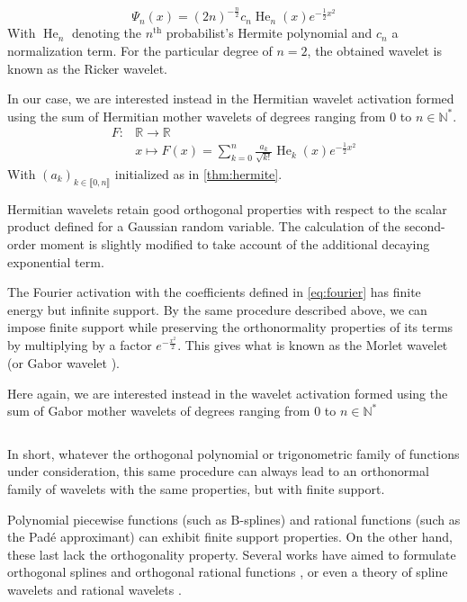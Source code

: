 \documentclass{article} %
\theoremstyle{plain}
\theoremstyle{definition}
\theoremstyle{remark}
\begin{document}
\begin{equation}
{\displaystyle \Psi _{n}(x)=(2n)^{-{\frac {n}{2}}}c_{n}\operatorname {He} _{n}\left(x\right)e^{-{\frac {1}{2}}x^{2}}}
\end{equation}
With $\operatorname {He} _{n}$ denoting the ${\displaystyle n^{\textrm {th}}}$ probabilist's Hermite polynomial and $c_n$ a normalization term. For the particular degree of $n = 2$, the obtained wavelet is known as the Ricker wavelet.

In our case, we are interested instead in the Hermitian wavelet activation formed using the sum of Hermitian mother wavelets of degrees ranging from $0$ to $n \in \mathbb{N}^*$.
\begin{align}
    F \colon & \mathbb{R} \to \mathbb{R}  \nonumber \\
     & x \mapsto F(x)= \sum^{n}_{k=0} \frac{a_k}{\sqrt{k!}}\operatorname{He}_k(x) e^{-{\frac {1}{2}}x^{2}}
\end{align}
With $(a_k)_{k \in \llbracket 0,n \rrbracket }$ initialized as in \ref{thm:hermite}.

Hermitian wavelets retain good orthogonal properties with respect to the scalar product defined for a Gaussian random variable. The calculation of the second-order moment is slightly modified to take account of the additional decaying exponential term.


The Fourier activation with the coefficients defined in \ref{eq:fourier} has finite energy but infinite support. By the same procedure described above, we can impose finite support while preserving the orthonormality properties of its terms by multiplying by a factor $e^{-\frac{x^2}{2}}$. This gives what is known as the Morlet wavelet \cite{grossmann1984decomposition} (or Gabor wavelet \cite{gabor1946theory}).

Here again, we are interested instead in the wavelet activation formed using the sum of Gabor mother wavelets of degrees ranging from $0$ to $n \in \mathbb{N}^*$

\begin{equation}
\end{equation}

In short, whatever the orthogonal polynomial or trigonometric family of functions under consideration, this same procedure can always lead to an orthonormal family of wavelets with the same properties, but with finite support.

Polynomial piecewise functions (such as B-splines) and rational functions (such as the Padé approximant) can exhibit finite support properties. On the other hand, these last lack the orthogonality property. Several works have aimed to formulate orthogonal splines \cite{mason1993orthogonal, alavi2023orthogonal} and orthogonal rational functions \cite{bultheel2001orthogonal}, or even a theory of spline wavelets \cite{chui1991cardinal} and rational wavelets \cite{zheng1999rational, choueiter2007implementation}.
\end{document}
